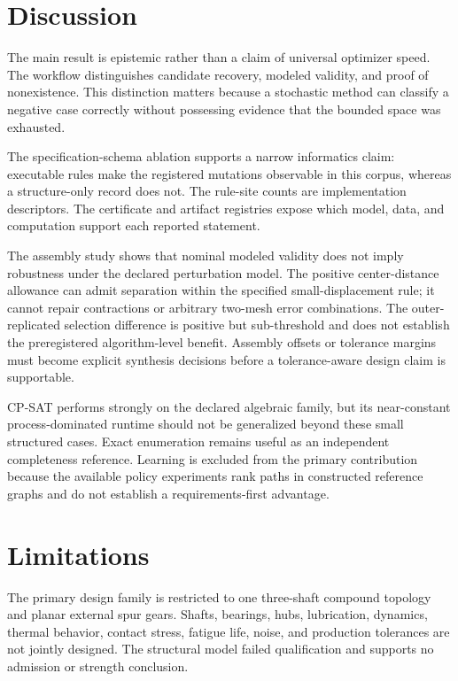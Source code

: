\documentclass[preprint,12pt]{elsarticle}
\begin{document}
\section{Discussion}
The main result is epistemic rather than a claim of universal optimizer speed. The workflow distinguishes candidate recovery, modeled validity, and proof of nonexistence. This distinction matters because a stochastic method can classify a negative case correctly without possessing evidence that the bounded space was exhausted.

The specification-schema ablation supports a narrow informatics claim: executable rules make the registered mutations observable in this corpus, whereas a structure-only record does not. The rule-site counts are implementation descriptors. The certificate and artifact registries expose which model, data, and computation support each reported statement.

The assembly study shows that nominal modeled validity does not imply robustness under the declared perturbation model. The positive center-distance allowance can admit separation within the specified small-displacement rule; it cannot repair contractions or arbitrary two-mesh error combinations. The outer-replicated selection difference is positive but sub-threshold and does not establish the preregistered algorithm-level benefit. Assembly offsets or tolerance margins must become explicit synthesis decisions before a tolerance-aware design claim is supportable.

CP-SAT performs strongly on the declared algebraic family, but its near-constant process-dominated runtime should not be generalized beyond these small structured cases. Exact enumeration remains useful as an independent completeness reference. Learning is excluded from the primary contribution because the available policy experiments rank paths in constructed reference graphs and do not establish a requirements-first advantage.

\section{Limitations}
The primary design family is restricted to one three-shaft compound topology and planar external spur gears. Shafts, bearings, hubs, lubrication, dynamics, thermal behavior, contact stress, fatigue life, noise, and production tolerances are not jointly designed. The structural model failed qualification and supports no admission or strength conclusion.
\end{document}
